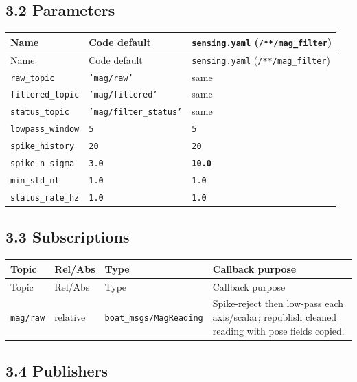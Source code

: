 \subsection{3.2 Parameters}


\begin{center}
\small
\begin{longtable}{@{}llp{7.2cm}@{}}
\toprule
Name & Code default & \texttt{sensing.yaml} (\texttt{/**/mag\_filter}) \\
\midrule
\endfirsthead
\toprule
Name & Code default & \texttt{sensing.yaml} (\texttt{/**/mag\_filter}) \\
\midrule
\endhead
\texttt{raw\_topic} & \texttt{'mag/raw'} & same \\
\texttt{filtered\_topic} & \texttt{'mag/filtered'} & same \\
\texttt{status\_topic} & \texttt{'mag/filter\_status'} & same \\
\texttt{lowpass\_window} & \texttt{5} & \texttt{5} \\
\texttt{spike\_history} & \texttt{20} & \texttt{20} \\
\texttt{spike\_n\_sigma} & \texttt{3.0} & \textbf{\texttt{10.0}} \\
\texttt{min\_std\_nt} & \texttt{1.0} & \texttt{1.0} \\
\texttt{status\_rate\_hz} & \texttt{1.0} & \texttt{1.0} \\
\bottomrule
\end{longtable}
\end{center}


\subsection{3.3 Subscriptions}


\begin{center}
\small
\begin{longtable}{@{}lllp{5.2cm}@{}}
\toprule
Topic & Rel/Abs & Type & Callback purpose \\
\midrule
\endfirsthead
\toprule
Topic & Rel/Abs & Type & Callback purpose \\
\midrule
\endhead
\texttt{mag/raw} & relative & \texttt{boat\_msgs/MagReading} & Spike-reject then low-pass each axis/scalar; republish cleaned reading with pose fields copied. \\
\bottomrule
\end{longtable}
\end{center}


\subsection{3.4 Publishers}



